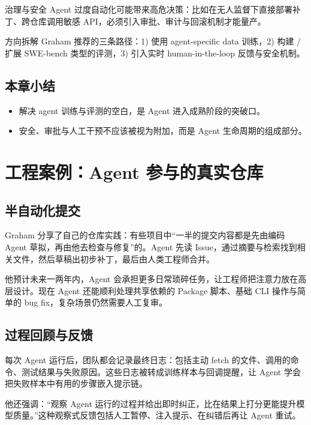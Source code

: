 \documentclass[a4paper]{article}
\begin{document}
\begin{warningbox}{治理与安全}
Agent 过度自动化可能带来高危决策：比如在无人监督下直接部署补丁、跨仓库调用敏感 API，必须引入审批、审计与回滚机制才能量产。
\end{warningbox}

\begin{importantbox}{方向拆解}
Graham 推荐的三条路径：1) 使用 agent-specific data 训练，2) 构建 / 扩展 SWE-bench 类型的评测，3) 引入实时 human-in-the-loop 反馈与安全机制。
\end{importantbox}

\subsection{本章小结}
\begin{itemize}
    \item 解决 agent 训练与评测的空白，是 Agent 进入成熟阶段的突破口。
    \item 安全、审批与人工干预不应该被视为附加，而是 Agent 生命周期的组成部分。
\end{itemize}

\section{工程案例：Agent 参与的真实仓库}
\subsection{半自动化提交}
Graham 分享了自己的仓库实践：有些项目中“一半的提交内容都是先由编码 Agent 草拟，再由他去检查与修复”的。Agent 先读 Issue，通过摘要与检索找到相关文件，然后草稿出初步补丁，最后由人类工程师合并。

他预计未来一两年内，Agent 会承担更多日常琐碎任务，让工程师把注意力放在高层设计。现在 Agent 还能顺利处理共享依赖的 Package 脚本、基础 CLI 操作与简单的 bug fix，复杂场景仍然需要人工复审。

\subsection{过程回顾与反馈}
每次 Agent 运行后，团队都会记录最终日志：包括主动 fetch 的文件、调用的命令、测试结果与失败原因。这些日志被转成训练样本与回调提醒，让 Agent 学会把失败样本中有用的步骤嵌入提示链。

他还强调：“观察 Agent 运行的过程并给出即时纠正，比在结果上打分更能提升模型质量。”这种观察式反馈包括人工暂停、注入提示、在纠错后再让 Agent 重试。
\end{document}
